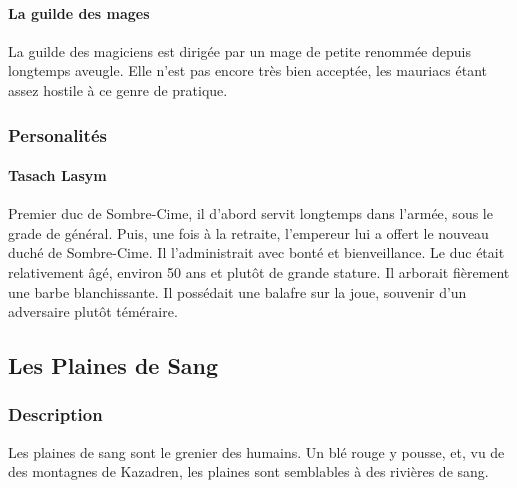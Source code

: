 \paragraph{La guilde des mages}
La guilde des magiciens est dirigée par un mage de petite renommée depuis longtemps aveugle. Elle n’est pas encore très bien acceptée, les mauriacs étant assez hostile à ce genre de pratique. 
\subsubsection{Personalités}
\paragraph{Tasach Lasym}
Premier duc de Sombre-Cime, il d'abord servit longtemps dans l'armée, sous le grade de général.
Puis, une fois à la retraite, l'empereur lui a offert le nouveau duché de Sombre-Cime.
Il l'administrait avec bonté et bienveillance.
Le duc était relativement âgé, environ 50 ans et plutôt de grande stature.
Il arborait fièrement une barbe blanchissante.
Il possédait une balafre sur la joue, souvenir d'un adversaire plutôt téméraire.
\subsection{Les Plaines de Sang}
\subsubsection{Description}
\hypertarget{lesplainesdesang}{}
Les plaines de sang sont le grenier des humains. Un blé rouge y pousse, et, vu de des montagnes de Kazadren, les plaines sont semblables à des rivières de sang.
